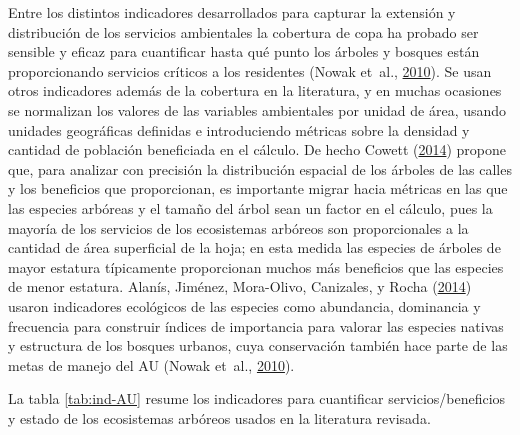\documentclass[12pt,a4paper,oneside, openany]{book}
\theoremstyle{definition}
\theoremstyle{definition}
\theoremstyle{definition}
\theoremstyle{remark}
\begin{document}
Entre los distintos indicadores desarrollados para capturar la extensión
y distribución de los servicios ambientales la cobertura de copa ha
probado ser sensible y eficaz para cuantificar hasta qué punto los
árboles y bosques están proporcionando servicios críticos a los
residentes (Nowak et~al.,
\protect\hyperlink{ref-nowak_sustaining_2010}{2010}). Se usan otros
indicadores además de la cobertura en la literatura, y en muchas
ocasiones se normalizan los valores de las variables ambientales por
unidad de área, usando unidades geográficas definidas e introduciendo
métricas sobre la densidad y cantidad de población beneficiada en el
cálculo. De hecho Cowett
(\protect\hyperlink{ref-cowett_methodology_2014}{2014}) propone que,
para analizar con precisión la distribución espacial de los árboles de
las calles y los beneficios que proporcionan, es importante migrar hacia
métricas en las que las especies arbóreas y el tamaño del árbol sean un
factor en el cálculo, pues la mayoría de los servicios de los
ecosistemas arbóreos son proporcionales a la cantidad de área
superficial de la hoja; en esta medida las especies de árboles de mayor
estatura típicamente proporcionan muchos más beneficios que las especies
de menor estatura. Alanís, Jiménez, Mora-Olivo, Canizales, y Rocha
(\protect\hyperlink{ref-alanis_estructura_2014}{2014}) usaron
indicadores ecológicos de las especies como abundancia, dominancia y
frecuencia para construir índices de importancia para valorar las
especies nativas y estructura de los bosques urbanos, cuya conservación
también hace parte de las metas de manejo del AU (Nowak et~al.,
\protect\hyperlink{ref-nowak_sustaining_2010}{2010}).

La tabla \ref{tab:ind-AU} resume los indicadores para cuantificar
servicios/beneficios y estado de los ecosistemas arbóreos usados en la
literatura revisada.
\end{document}
